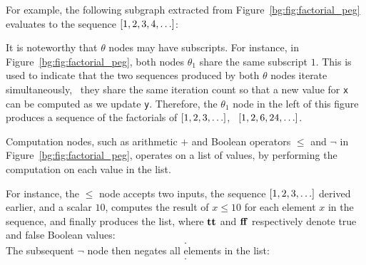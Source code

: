 For example, the following subgraph extracted from
Figure~\ref{bg:fig:factorial_peg} evaluates to the sequence $[1, 2, 3, 4,
\mathellipsis]$:
\begin{center}
    \vspace{-16.5pt}
    \vspace{-16.5pt}
\end{center}

It is noteworthy that $\theta$ nodes may have subscripts.  For instance,
in Figure~\ref{bg:fig:factorial_peg}, both nodes $\theta_1$ share the same
subscript $1$.  This is used to indicate that the two sequences produced
by both $\theta$ nodes iterate simultaneously, \ie~they share the same
iteration count so that a new value for \verb|x| can be computed as we update
\verb|y|.  Therefore, the $\theta_1$ node in the left of this figure produces
a sequence of the factorials of $[1, 2, 3, \mathellipsis]$, \ie~$[1, 2, 6, 24,
\mathellipsis]$.

Computation nodes, such as arithmetic $+$ and Boolean operators $\leq$ and
$\neg$ in Figure~\ref{bg:fig:factorial_peg}, operates on a list of values, by
performing the computation on each value in the list.

For instance, the $\leq$ node accepts two inputs, the sequence $[1, 2, 3,
\mathellipsis]$ derived earlier, and a scalar $10$, computes the result of $x
\leq 10$ for each element $x$ in the sequence, and finally produces the list,
where $\mathbf{tt}$ and $\mathbf{ff}$ respectively denote true and false Boolean
values:
\begin{equation}
    [
        \truelit, \truelit, \truelit, \truelit, \truelit,
        \truelit, \truelit, \truelit, \truelit, \truelit,
        \falselit, \falselit, \falselit, \mathellipsis
    ].
\end{equation}
The subsequent $\neg$ node then negates all elements in the list:
\begin{equation}
    [
        \falselit, \falselit, \falselit, \falselit, \falselit,
        \falselit, \falselit, \falselit, \falselit, \falselit,
        \truelit, \truelit, \truelit, \mathellipsis
    ].
    \label{bg:eq:bool_seq}
\end{equation}

